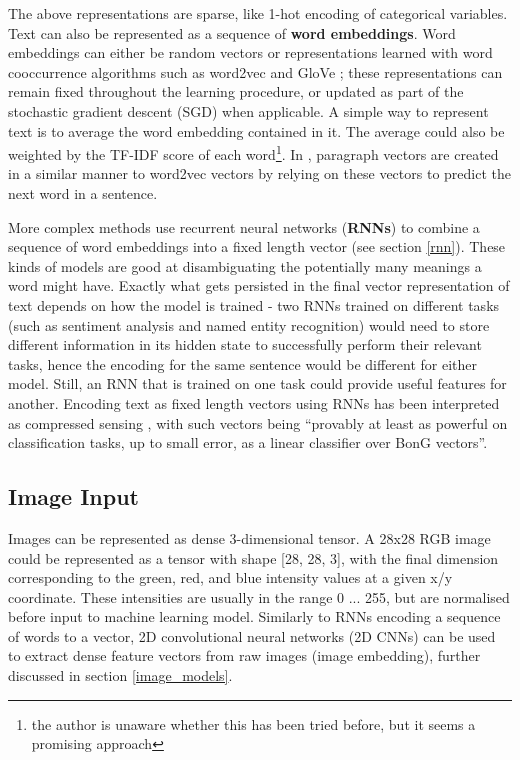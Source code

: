 The above representations are sparse, like 1-hot encoding of categorical variables.
Text can also be  represented as a sequence of \textbf{word embeddings}.
Word embeddings can either be random vectors or representations  learned with word cooccurrence algorithms such as word2vec \cite{word2vec} and GloVe \cite{glove};  these representations can remain fixed throughout the learning procedure, or updated as part of the stochastic gradient descent (SGD) when applicable.
A simple way to represent text is to average the word embedding contained in it.
The  average could also be weighted by the TF-IDF score of each word\footnote{the author is unaware whether this has been tried before, but it seems a promising approach}.
In \cite{doc2vec}, paragraph vectors are created in a similar manner to word2vec vectors by relying on these vectors to predict the next word in a sentence.

More complex methods use recurrent neural networks (\textbf{RNNs}) to combine a sequence of word embeddings  into a fixed length vector (see section \ref{rnn}).
These kinds of models are good at  disambiguating the potentially many meanings a word might have.
Exactly what gets persisted in the final  vector representation of text depends on how the model is trained - two RNNs  trained on different tasks (such as sentiment analysis and named entity recognition)  would need to store different information in its hidden state to successfully  perform their relevant tasks,  hence the encoding for the same sentence would be different for either model.
Still, an RNN  that is trained on one task could provide useful features for another.
Encoding text as fixed length vectors using RNNs has been interpreted as compressed sensing \cite{compressed_sensing_rnn}, with such vectors being ``provably at least as powerful on classification tasks, up to small error, as a linear classifier over BonG vectors''.

\subsection{Image Input}

Images can be represented as dense 3-dimensional tensor.
A 28x28 RGB image could be represented as a tensor with shape [28, 28, 3],  with the final dimension corresponding to the green, red, and blue intensity values at a given x/y coordinate.
These intensities  are usually in the range 0 ... 255, but are normalised before input to machine learning model.
Similarly to RNNs  encoding a sequence of words to a vector, 2D convolutional neural networks (2D CNNs)  can be used to extract dense feature vectors from raw images (image embedding),  further discussed in section \ref{image_models}.

